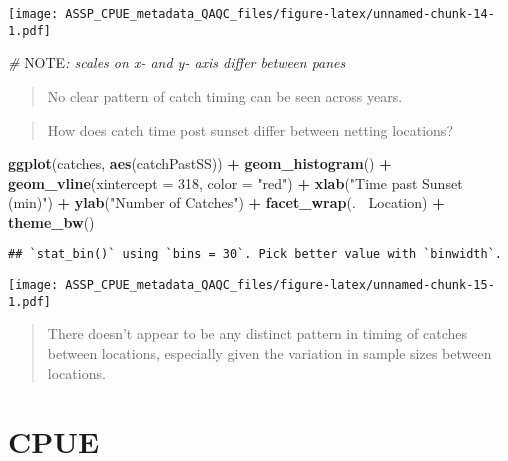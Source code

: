 \documentclass[
]{article}
\newenvironment{Shaded}{\begin{snugshade}}{\end{snugshade}}
\newcommand{\AlertTok}[1]{\textcolor[rgb]{0.94,0.16,0.16}{#1}}
\newcommand{\CommentTok}[1]{\textcolor[rgb]{0.56,0.35,0.01}{\textit{#1}}}
\newcommand{\DataTypeTok}[1]{\textcolor[rgb]{0.13,0.29,0.53}{#1}}
\newcommand{\DecValTok}[1]{\textcolor[rgb]{0.00,0.00,0.81}{#1}}
\newcommand{\KeywordTok}[1]{\textcolor[rgb]{0.13,0.29,0.53}{\textbf{#1}}}
\newcommand{\NormalTok}[1]{#1}
\newcommand{\OperatorTok}[1]{\textcolor[rgb]{0.81,0.36,0.00}{\textbf{#1}}}
\newcommand{\StringTok}[1]{\textcolor[rgb]{0.31,0.60,0.02}{#1}}
\begin{document}
\texttt{[image: ASSP\_CPUE\_metadata\_QAQC\_files/figure-latex/unnamed-chunk-14-1.pdf]}

\begin{Shaded}
\begin{Highlighting}[]
\CommentTok{# }\AlertTok{NOTE}\CommentTok{: scales on x- and y- axis differ between panes}
\end{Highlighting}
\end{Shaded}

\begin{quote}
No clear pattern of catch timing can be seen across years.
\end{quote}

\begin{quote}
How does catch time post sunset differ between netting locations?
\end{quote}

\begin{Shaded}
\begin{Highlighting}[]
\KeywordTok{ggplot}\NormalTok{(catches, }\KeywordTok{aes}\NormalTok{(catchPastSS)) }\OperatorTok{+}
\StringTok{  }\KeywordTok{geom_histogram}\NormalTok{() }\OperatorTok{+}
\StringTok{  }\KeywordTok{geom_vline}\NormalTok{(}\DataTypeTok{xintercept =} \DecValTok{318}\NormalTok{, }\DataTypeTok{color =} \StringTok{"red"}\NormalTok{) }\OperatorTok{+}
\StringTok{  }\KeywordTok{xlab}\NormalTok{(}\StringTok{"Time past Sunset (min)"}\NormalTok{) }\OperatorTok{+}\StringTok{ }\KeywordTok{ylab}\NormalTok{(}\StringTok{"Number of Catches"}\NormalTok{) }\OperatorTok{+}
\StringTok{  }\KeywordTok{facet_wrap}\NormalTok{(.}\OperatorTok{~}\StringTok{ }\NormalTok{Location) }\OperatorTok{+}
\StringTok{  }\KeywordTok{theme_bw}\NormalTok{()}
\end{Highlighting}
\end{Shaded}

\begin{verbatim}
## `stat_bin()` using `bins = 30`. Pick better value with `binwidth`.
\end{verbatim}

\texttt{[image: ASSP\_CPUE\_metadata\_QAQC\_files/figure-latex/unnamed-chunk-15-1.pdf]}

\begin{quote}
There doesn't appear to be any distinct pattern in timing of catches
between locations, especially given the variation in sample sizes
between locations.
\end{quote}

\hypertarget{cpue}{%
\section{CPUE}\label{cpue}}
\end{document}
